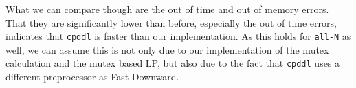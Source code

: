 What we can compare though are the out of time and out of memory errors.
That they are significantly lower than before, especially the out of time errors, indicates that \texttt{cpddl} is faster than our implementation.
As this holds for \texttt{all-N} as well, we can assume this is not only due to our implementation of the mutex calculation and the mutex based LP, but also due to the fact that \texttt{cpddl} uses a different preprocessor as Fast Downward.
